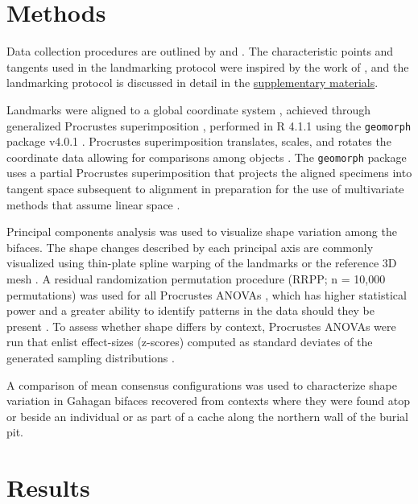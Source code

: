 \documentclass[]{interact}
\theoremstyle{plain}%
\theoremstyle{definition}
\theoremstyle{remark}
\begin{document}
\hypertarget{methods}{%
\section{Methods}\label{methods}}

Data collection procedures are outlined by \cite{RN8154} and
\cite{RN8318}. The characteristic points and tangents used in the
landmarking protocol were inspired by the work of \cite{RN5700}, and the
landmarking protocol is discussed in detail in the
\href{https://seldenlab.github.io/gahaganmorph.3/}{supplementary
materials}.

Landmarks were aligned to a global coordinate system
\citep{RN8102,RN8587,RN8384}, achieved through generalized Procrustes
superimposition \citep{RN8525}, performed in R 4.1.1 \citep{RN8584}
using the \texttt{geomorph} package v4.0.1 \citep{RN8565,RN9565}.
Procrustes superimposition translates, scales, and rotates the
coordinate data allowing for comparisons among objects
\citep{RN5698,RN8525}. The \texttt{geomorph} package uses a partial
Procrustes superimposition that projects the aligned specimens into
tangent space subsequent to alignment in preparation for the use of
multivariate methods that assume linear space \citep{RN8511,RN8384}.

Principal components analysis \citep{RN8576,RN10875} was used to
visualize shape variation among the bifaces. The shape changes described
by each principal axis are commonly visualized using thin-plate spline
warping of the landmarks or the reference 3D mesh \citep{RN8555,RN8553}.
A residual randomization permutation procedure (RRPP; n = 10,000
permutations) was used for all Procrustes ANOVAs \citep{RN8579,RN8334},
which has higher statistical power and a greater ability to identify
patterns in the data should they be present \citep{RN6995}. To assess
whether shape differs by context, Procrustes ANOVAs \citep{RN7046} were
run that enlist effect-sizes (z-scores) computed as standard deviates of
the generated sampling distributions \citep{RN8477}.

A comparison of mean consensus configurations was used to characterize
shape variation in Gahagan bifaces recovered from contexts where they
were found atop or beside an individual or as part of a cache along the
northern wall of the burial pit.

\hypertarget{results}{%
\section{Results}\label{results}}
\end{document}
